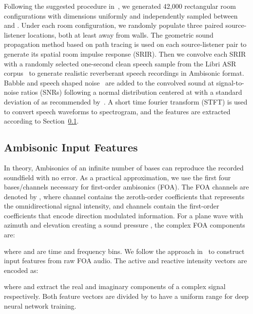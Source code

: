 \documentclass[a4paper]{article}
\begin{document}
Following the suggested procedure in~\cite{perotin2018crnn}, we generated 42,000 rectangular room configurations with dimensions uniformly and independently sampled between  and . Under each room configuration, we randomly populate three paired source-listener locations, both at least  away from walls. The geometric sound propagation method based on path tracing is used on each source-listener pair to generate its spatial room impulse response (SRIR). Then we convolve each SRIR with a randomly selected one-second clean speech sample from the Libri ASR corpus~\cite{panayotov2015librispeech} to generate realistic reverberant speech recordings in Ambisonic format. Babble and speech shaped noise~\cite{valentini2017noisy} are added to the convolved sound at signal-to-noise ratios (SNRs) following a normal distribution centered at  with a standard deviation of  as recommended by~\cite{yin2015noisy}. A short time fourier transform (STFT) is used to convert speech waveforms to spectrogram, and the features are extracted according to Section~\ref{sec:feature}. 


\subsection{Ambisonic Input Features}
\label{sec:feature}


In theory, Ambisonics of an infinite number of bases can reproduce the recorded soundfield with no error. As a practical approximation, we use the first four bases/channels necessary for first-order ambisonics (FOA). The FOA channels are denoted by , where  channel contains the zeroth-order coefficients that represents the omnidirectional signal intensity, and  channels contain the first-order coefficients that encode direction modulated information. For a plane wave with azimuth  and elevation  creating a sound pressure , the complex FOA components are:

where  and  are time and frequency bins. We follow the approach in~\cite{perotin2018crnn} to construct input features from raw FOA audio. The active and reactive intensity vectors are encoded as:

where  and  extract the real and imaginary components of a complex signal respectively. Both feature vectors are divided by 
to have a uniform range for deep neural network training.
\end{document}
